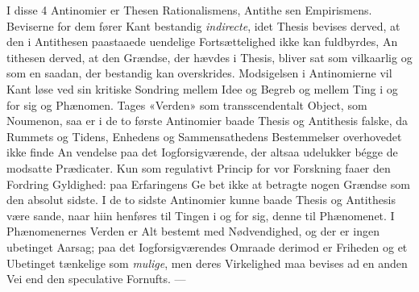 \documentclass[12pt,a4paper]{book}
\begin{document}
I disse 4 Antinomier er Thesen Rationalismens, Antithe\-%
sen Empirismens. Beviserne for dem fører Kant bestandig
\emph{indirecte}, idet Thesis bevises derved, at den i Antithesen
paastaaede uendelige Fortsættelighed ikke kan fuldbyrdes, An\-%
tithesen derved, at den Grændse, der hævdes i Thesis, bliver
sat som vilkaarlig og som en saadan, der bestandig kan
overskrides. Modsigelsen i Antinomierne vil Kant løse ved sin
kritiske Sondring mellem Idee og Begreb og mellem Ting i og for
sig og Phænomen. Tages «Verden» som transscendentalt Object,
som Noumenon, saa er i de to første Antinomier baade Thesis
og Antithesis falske, da Rummets og Tidens, Enhedens og
Sammensathedens Bestemmelser overhovedet ikke finde An\-%
vendelse paa det Iogforsigværende, der altsaa udelukker bégge
de modsatte Prædicater. Kun som regulativt Princip for vor
Forskning faaer den Fordring Gyldighed: paa Erfaringens Ge\-%
bet ikke at betragte nogen Grændse som den absolut sidste.
I de to sidste Antinomier kunne baade Thesis og Antithesis
være sande, naar hiin henføres til Tingen i og for sig, denne
til Phænomenet. I Phænomenernes Verden er Alt bestemt
med Nødvendighed, og der er ingen ubetinget Aarsag; paa
det Iogforsigværendes Omraade derimod er Friheden og et
Ubetinget tænkelige som \emph{mulige}, men deres Virkelighed maa
bevises ad en anden Vei end den speculative Fornufts. ---
\end{document}
